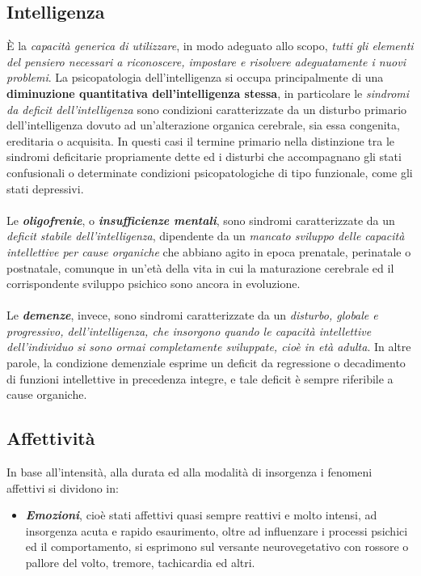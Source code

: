 \subsection{Intelligenza}

È la \emph{capacità generica di utilizzare}, in modo adeguato allo
scopo, \emph{tutti gli elementi del pensiero necessari a riconoscere,
impostare e risolvere adeguatamente i nuovi problemi}. La psicopatologia
dell'intelligenza si occupa principalmente di una \textbf{diminuzione
quantitativa dell'intelligenza stessa}, in particolare le \emph{sindromi
da deficit dell'intelligenza} sono condizioni caratterizzate da un
disturbo primario dell'intelligenza dovuto ad un'alterazione organica
cerebrale, sia essa congenita, ereditaria o acquisita. In questi casi il
termine primario nella distinzione tra le sindromi deficitarie
propriamente dette ed i disturbi che accompagnano gli stati confusionali
o determinate condizioni psicopatologiche di tipo funzionale, come gli
stati depressivi.
\\\\
Le \textbf{\emph{oligofrenie}}, o \textbf{\emph{insufficienze mentali}},
sono sindromi caratterizzate da un \emph{deficit stabile
dell'intelligenza}, dipendente da un \emph{mancato sviluppo delle
capacità intellettive per cause organiche} che abbiano agito in epoca
prenatale, perinatale o postnatale, comunque in un'età della vita in cui
la maturazione cerebrale ed il corrispondente sviluppo psichico sono
ancora in evoluzione.
\\\\
Le \textbf{\emph{demenze}}, invece, sono sindromi caratterizzate da un
\emph{disturbo, globale e progressivo, dell'intelligenza, che insorgono
quando le capacità intellettive dell'individuo si sono ormai
completamente sviluppate, cioè in età adulta}. In altre parole, la
condizione demenziale esprime un deficit da regressione o decadimento di
funzioni intellettive in precedenza integre, e tale deficit è sempre
riferibile a cause organiche.

\subsection{Affettività}

In base all'intensità, alla durata ed alla modalità di insorgenza i
fenomeni affettivi si dividono in:

\begin{itemize}
\item
  \textbf{\emph{Emozioni}}, cioè stati affettivi quasi sempre reattivi e
  molto intensi, ad insorgenza acuta e rapido esaurimento, oltre ad
  influenzare i processi psichici ed il comportamento, si esprimono sul
  versante neurovegetativo con rossore o pallore del volto, tremore,
  tachicardia ed altri.
\end{itemize}

